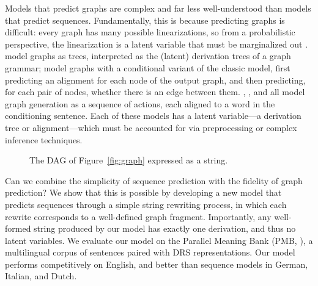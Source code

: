 \documentclass[11pt,a4paper]{article}
\theoremstyle{plain}
\begin{document}
Models that predict graphs are complex and far less well-understood than models that predict sequences. Fundamentally, this is because predicting graphs is difficult: every graph has many possible linearizations, so from a probabilistic perspective, the linearization is a latent variable that must be marginalized out \citep{li2018learning}. \citet{groschwitz2018amr} model graphs as trees, interpreted as the (latent) derivation trees of a graph grammar; \citet{lyu2018amr} model graphs with a conditional variant of the classic \citet{erdos+renyi} model, first predicting an alignment for each node of the output graph, and then predicting, for each pair of nodes, whether there is an edge between them. \citet{buys2017robust}, \citet{chen2018sequence}, and \citet{damonte2017incremental} all model graph generation as a sequence of actions, each aligned to a word in the conditioning sentence. Each of these models has a latent variable---a derivation tree or alignment---which must be accounted for via preprocessing or complex inference techniques.

\begin{figure}
\centering
{}
\caption{\label{fig:penman} The DAG of Figure~\ref{fig:graph} expressed as a string.}
\end{figure}

Can we combine the simplicity of sequence prediction with the fidelity of graph prediction? We show that this is possible by developing a new model that predicts sequences through a simple string rewriting process, in which each rewrite corresponds to a well-defined graph fragment. Importantly, any well-formed string produced by our model has exactly one derivation, and thus no latent variables. We evaluate our model on the Parallel Meaning Bank (PMB, \citealt{abzianidze2017parallel}), a multilingual corpus of sentences paired with DRS representations. Our model performs competitively on English, and better than sequence models in German, Italian, and Dutch.  
\end{document}
